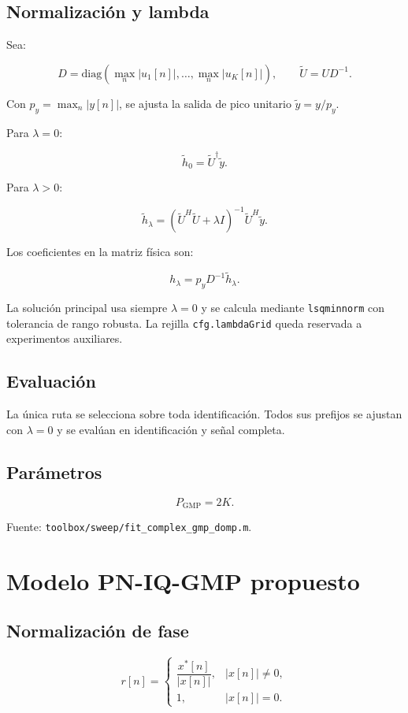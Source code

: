 \documentclass[10pt,a4paper]{article}
\newcommand{\code}[1]{\texttt{#1}}
\begin{document}
\subsection{Normalización y lambda}

Sea:

\[
D=\mathrm{diag}(\max_n|u_1[n]|,\ldots,\max_n|u_K[n]|),
\qquad
\widetilde U=UD^{-1}.
\]

Con \(p_y=\max_n|y[n]|\), se ajusta la salida de pico unitario
\(\widetilde y=y/p_y\).

Para \(\lambda=0\):

\[
\widetilde h_0=\widetilde U^\dagger \widetilde y.
\]

Para \(\lambda>0\):

\[
\widetilde h_\lambda
=(\widetilde U^H\widetilde U+\lambda I)^{-1}
\widetilde U^H\widetilde y.
\]

Los coeficientes en la matriz física son:

\[
h_\lambda=p_yD^{-1}\widetilde h_\lambda.
\]

La solución principal usa siempre \(\lambda=0\) y se calcula mediante
\code{lsqminnorm} con tolerancia de rango robusta. La rejilla
\code{cfg.lambdaGrid} queda reservada a experimentos auxiliares.

\subsection{Evaluación}

La única ruta se selecciona sobre toda identificación. Todos sus prefijos se
ajustan con \(\lambda=0\) y se evalúan en identificación y señal completa.

\subsection{Parámetros}

\[
P_{\mathrm{GMP}}=2K.
\]

Fuente: \code{toolbox/sweep/fit\_complex\_gmp\_domp.m}.

\section{Modelo PN-IQ-GMP propuesto}

\subsection{Normalización de fase}

\[
r[n]=
\begin{cases}
\dfrac{x^*[n]}{|x[n]|},&|x[n]|\neq0,\\[4pt]
1,&|x[n]|=0.
\end{cases}
\]
\end{document}
